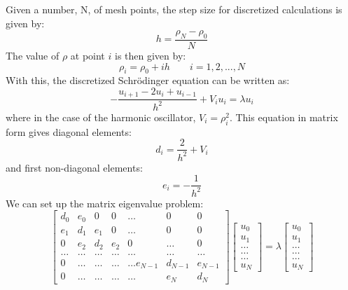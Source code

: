 \documentclass[10pt,showpacs,preprintnumbers,footinbib,amsmath,amssymb,aps,prl,twocolumn,groupedaddress,superscriptaddress,showkeys]{revtex4-1}
\begin{document}
Given a number, N, of mesh points, the step size for discretized calculations is given by:
\begin{equation}
	 h = \frac{\rho_N-\rho_0}{N}
\end{equation}
The value of $\rho$ at point $i$ is then given by:
\begin{equation}
\rho_i = \rho_0+ih \qquad i = 1,2, ... ,N
\end{equation}
With this, the discretized Schr\"{o}dinger equation can be written as:
\begin{equation}
-\frac{u_{i+1}-2u_i+u_{i-1}}{h^2}+V_i u_i = \lambda u_i
\end{equation}
where in the case of the harmonic oscillator, $V_i = \rho_i^2$. This equation in matrix form gives diagonal elements:
\begin{equation}
d_i = \frac{2}{h^2}+V_i
\end{equation}
and first non-diagonal elements:
\begin{equation}
e_i = -\frac{1}{h^2}
\end{equation}
We can set up the matrix eigenvalue problem:
\begin{equation*}
    \begin{bmatrix}d_0 & e_0 & 0   & 0    & \dots  &0     & 0 \\
                                e_1 & d_1 & e_1 & 0    & \dots  &0     &0 \\
                                0   & e_2 & d_2 & e_2  &0       &\dots & 0\\
                                \dots  & \dots & \dots & \dots  &\dots      &\dots & \dots\\
                                0   & \dots & \dots & \dots  &\dots  e_{N-1}     &d_{N-1} & e_{N-1}\\
                                0   & \dots & \dots & \dots  &\dots       &e_{N} & d_{N}
             \end{bmatrix}   \begin{bmatrix} u_{0} \\
                                                                           u_{1} \\
                                                                           \dots\\ \dots\\ \dots\\
                                                                           u_{N}
                          \end{bmatrix}=\lambda \begin{bmatrix} u_{0} \\
                                                                           u_{1} \\
                                                                           \dots\\ \dots\\ \dots\\
                                                                           u_{N}
                          \end{bmatrix}
\end{equation*}
\end{document}
